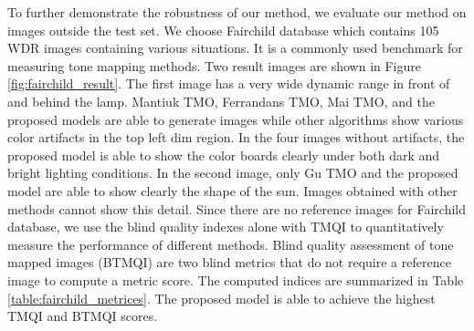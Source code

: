 \documentclass[journal]{IEEEtran}
\begin{document}
To further demonstrate the robustness of our method, we evaluate our method on images outside the test set. We choose Fairchild database \cite{fairchild2007hdr} which contains 105 WDR images containing various situations. It is a commonly used benchmark for measuring tone mapping methods. Two result images are shown in Figure \ref{fig:fairchild_result}. The first image has a very wide dynamic range in front of and behind the lamp. Mantiuk TMO, Ferrandans TMO, Mai TMO, and the proposed models are able to generate images while other algorithms show various color artifacts in the top left dim region. In the four images without artifacts, the proposed model is able to show the color boards clearly under both dark and bright lighting conditions. In the second image, only Gu TMO and the proposed model are able to show clearly the shape of the sun. Images obtained with other methods cannot show this detail. Since there are no reference images for Fairchild database, we use the blind quality indexes alone with TMQI \cite{Hojatollah2013Objective} to quantitatively measure the performance of different methods.  Blind quality assessment of tone mapped images (BTMQI) \cite{Ke2016Blind} are two blind metrics that do not require a reference image to compute a metric score.  The computed indices are summarized in Table \ref{table:fairchild_metrices}. The proposed model is able to achieve the highest TMQI and BTMQI scores.

\end{document}
